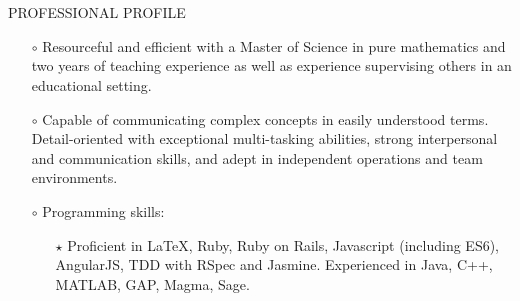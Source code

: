 \documentclass[10pt]{article}
\begin{document}
\pagestyle{fancyplain}




~\\~\\
\noindent \textsf{PROFESSIONAL PROFILE}
\begin{itemize}
    \item[$\circ$] Resourceful and efficient with a Master of Science in pure mathematics and two years of teaching experience as well as experience supervising others in an educational setting.
    \item[$\circ$] Capable of communicating complex concepts in easily understood terms. Detail-oriented with exceptional multi-tasking abilities, strong interpersonal and communication skills, and adept in independent operations and team environments.
    \item[$\circ$] Programming skills:
    \begin{itemize}
        \item[$\star$] Proficient in \LaTeX, Ruby, Ruby on Rails, Javascript (including ES6), AngularJS, TDD with RSpec and Jasmine.
        Experienced in Java, C++, MATLAB, GAP, Magma, Sage.
    \end{itemize}
\end{itemize}
\end{document}
